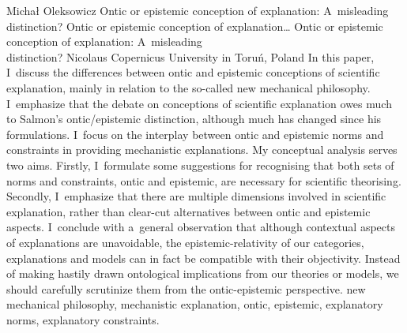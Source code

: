 \begin{artengenv}{Michał Oleksowicz}
	{Ontic or epistemic conception of explanation: A~misleading distinction?}
	{Ontic or epistemic conception of explanation\ldots}
	{Ontic or epistemic conception of explanation: A~misleading\\distinction?}
	{Nicolaus Copernicus University in Toruń, Poland}
	{In this paper, I~discuss the differences between ontic and epistemic conceptions of scientific explanation, mainly in relation to the so-called new mechanical philosophy. I~emphasize that the debate on conceptions of scientific explanation owes much to Salmon's ontic/epistemic distinction, although much has changed since his formulations. I~focus on the interplay between ontic and epistemic norms and constraints in providing mechanistic explanations. My conceptual analysis serves two aims. Firstly, I~formulate some suggestions for recognising that both sets of norms and constraints, ontic and epistemic, are necessary for scientific theorising. Secondly, I~emphasize that there are multiple dimensions involved in scientific explanation, rather than clear-cut alternatives between ontic and epistemic aspects. I~conclude with a~general observation that although contextual aspects of explanations are unavoidable, the epistemic-relativity of our categories, explanations and models can in fact be compatible with their objectivity. Instead of making hastily drawn ontological implications from our theories or models, we should carefully scrutinize them from the ontic-epistemic perspective.
	}
	{new mechanical philosophy, mechanistic explanation, ontic, epistemic, explanatory norms, explanatory constraints.}




\end{artengenv}
